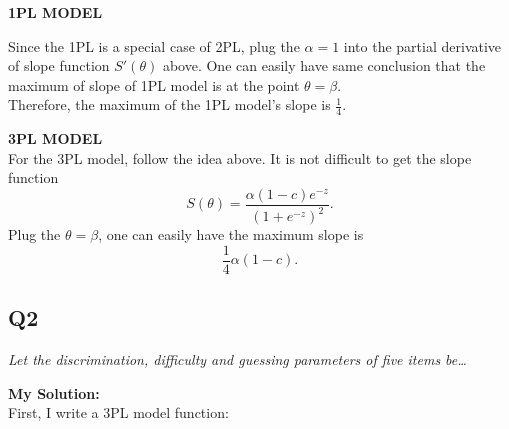 \documentclass[
]{article}
\begin{document}
\textbf{1PL MODEL}

Since the 1PL is a special case of 2PL, plug the \(\alpha = 1\) into the
partial derivative of slope function \(S'(\theta)\) above. One can
easily have same conclusion that the maximum of slope of 1PL model is at
the point \(\theta = \beta\).\\
Therefore, the maximum of the 1PL model's slope is \(\frac{1}{4}.\)

\textbf{3PL MODEL}\\
For the 3PL model, follow the idea above. It is not difficult to get the
slope function \[S(\theta)=\frac{\alpha (1-c) e^{-z}}{(1 + e^{-z})^2}.\]
Plug the \(\theta=\beta\), one can easily have the maximum slope is
\[\frac{1}{4}\alpha(1-c).\]

\hypertarget{q2}{%
\subsection{Q2}\label{q2}}

\emph{Let the discrimination, difficulty and guessing parameters of five
items be\ldots{}}

\textbf{My Solution:}\\
First, I write a 3PL model function:
\end{document}
